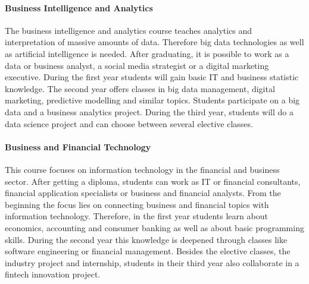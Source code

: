 \paragraph{Business Intelligence and Analytics}
The business intelligence and analytics course teaches analytics and interpretation of massive amounts of data. Therefore big data technologies as well as artificial intelligence is needed. After graduating, it is possible to work as a data or business analyst, a social media strategist or a digital marketing executive. During the first year students will gain basic IT and business statistic knowledge. The second year offers classes in big data management, digital marketing, predictive modelling and similar topics. Students participate on a big data and a business analytics project.
During the third year, students will do a data science project and can choose between several elective classes.

\paragraph{Business and Financial Technology}
This course focuses on information technology in the financial and business sector. After getting a diploma, students can work as IT or financial consultants, financial application specialists or business and financial analysts. From the beginning the focus lies on connecting business and financial topics with information technology. Therefore, in the first year students learn about economics, accounting and consumer banking as well as about basic programming skills. During the second year this knowledge is deepened through classes like software engineering or financial management. Besides the elective classes, the industry project and internship, students in their third year also collaborate in a fintech innovation project.

\newpage
